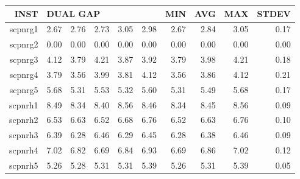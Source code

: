 \documentclass[11pt]{article}
\begin{document}
\begin{landscape}
        \begin{table}[]
            \begin{center}
            \begin{tabular}{r|rrrrr|rrrr}
                INST    & \multicolumn{5}{l}{DUAL GAP}     & MIN  & AVG  & MAX  & STDEV \\
                \hline
                scpnrg1 & 2.67 & 2.76 & 2.73 & 3.05 & 2.98 & 2.67 & 2.84 & 3.05 & 0.17  \\
                scpnrg2 & 0.00 & 0.00 & 0.00 & 0.00 & 0.00 & 0.00 & 0.00 & 0.00 & 0.00  \\
                scpnrg3 & 4.12 & 3.79 & 4.21 & 3.87 & 3.92 & 3.79 & 3.98 & 4.21 & 0.18  \\
                scpnrg4 & 3.79 & 3.56 & 3.99 & 3.81 & 4.12 & 3.56 & 3.86 & 4.12 & 0.21  \\
                scpnrg5 & 5.68 & 5.31 & 5.53 & 5.32 & 5.60 & 5.31 & 5.49 & 5.68 & 0.17  \\
                scpnrh1 & 8.49 & 8.34 & 8.40 & 8.56 & 8.46 & 8.34 & 8.45 & 8.56 & 0.09  \\
                scpnrh2 & 6.53 & 6.63 & 6.52 & 6.68 & 6.76 & 6.52 & 6.63 & 6.76 & 0.10  \\
                scpnrh3 & 6.39 & 6.28 & 6.46 & 6.29 & 6.45 & 6.28 & 6.38 & 6.46 & 0.09  \\
                scpnrh4 & 7.02 & 6.82 & 6.69 & 6.84 & 6.93 & 6.69 & 6.86 & 7.02 & 0.12  \\
                scpnrh5 & 5.26 & 5.28 & 5.31 & 5.31 & 5.39 & 5.26 & 5.31 & 5.39 & 0.05
            \end{tabular}
            \end{center}
        \end{table}
    \end{landscape}
\end{document}
